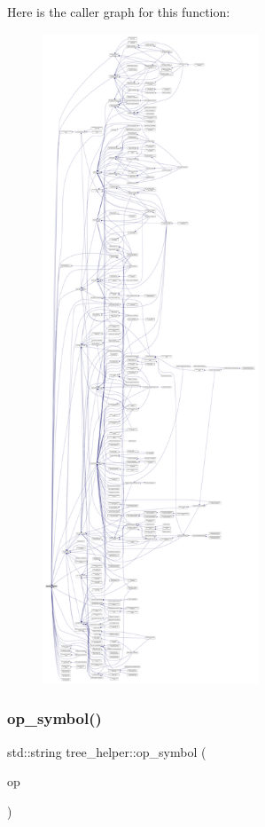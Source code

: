 Here is the caller graph for this function\+:
\nopagebreak
\begin{figure}[H]
\begin{center}
\leavevmode
\includegraphics[height=550pt]{d7/d99/classtree__helper_a6164be0a320aaf2cbc0e5f328dbdf884_icgraph}
\end{center}
\end{figure}
\mbox{\label{classtree__helper_afe92ad7fb9854908aa7b11f4bdb89e67}} 
\subsubsection{\texorpdfstring{op\+\_\+symbol()}{op\_symbol()}\hspace{0.1cm}{\footnotesize\ttfamily [1/2]}}
{\footnotesize\ttfamily std\+::string tree\+\_\+helper\+::op\+\_\+symbol (\begin{DoxyParamCaption}\item[{const \hyperlink{tree__node_8hpp_a6ee377554d1c4871ad66a337eaa67fd5}{tree\+\_\+node\+Ref} \&}]{op }\end{DoxyParamCaption})\hspace{0.3cm}{\ttfamily [static]}}



